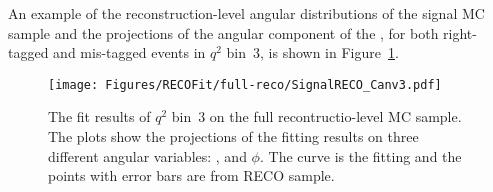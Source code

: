 An example of the reconstruction-level angular distributions of the signal MC sample and the projections of the angular component of the \pdf, for both right-tagged and mis-tagged events in $q^2$ bin~3, is shown in Figure~\ref{fig:fullreco-bin3}.







\begin{figure}[!hbt]
  \centering
  \texttt{[image: Figures/RECOFit/full-reco/SignalRECO\_Canv3.pdf]}
  \caption{The fit results of $q^2$ bin~3 on the full recontructio-level MC sample.
    The plots show the projections of the fitting results on three different angular variables: \cTL, \cTK and $\phi$.
    The curve is the fitting and the points with error bars are from RECO sample.}
  \label{fig:fullreco-bin3}
\end{figure}




